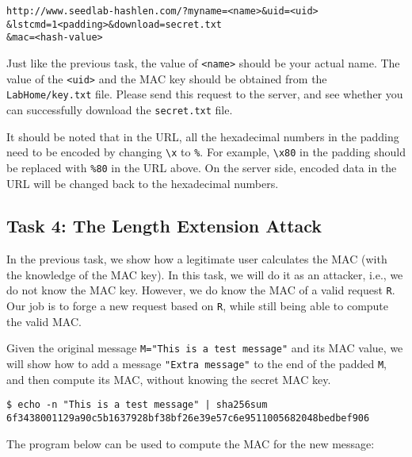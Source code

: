 \begin{lstlisting}
http://www.seedlab-hashlen.com/?myname=<name>&uid=<uid>
&lstcmd=1<padding>&download=secret.txt
&mac=<hash-value>
\end{lstlisting}

Just like the previous task, the value of \texttt{<name>} should be your actual name. 
The value of the \texttt{<uid>} and the MAC key should be 
obtained from the \texttt{LabHome/key.txt} file.
Please send this request to the server, and see whether you can
successfully download the \texttt{secret.txt} file.  

It should be noted that in the URL, 
all the hexadecimal numbers in the padding 
need to be encoded by changing
\texttt{\textbackslash x} to \texttt{\%}. For example, 
\texttt{\textbackslash x80} in the padding should be 
replaced with \texttt{\%80} in the URL above. 
On the server side, encoded data in the URL 
will be changed back to the hexadecimal numbers. 


\subsection{Task 4: The Length Extension Attack}


In the previous task, we show how a legitimate user calculates the MAC (with
the knowledge of the MAC key). In this task, we will do it as an attacker,
i.e., we do not know the MAC key. However, we do know the MAC of a valid 
request \texttt{R}. Our job is to forge a new request based on \texttt{R},
while still being able to compute the valid MAC. 

Given the original message \texttt{M="This is a test message"} and its 
MAC value, we will show how to add a message 
\texttt{"Extra message"} to the end of the padded \texttt{M}, and 
then compute its MAC, without knowing the secret MAC key. 

\begin{lstlisting}
$ echo -n "This is a test message" | sha256sum
6f3438001129a90c5b1637928bf38bf26e39e57c6e9511005682048bedbef906
\end{lstlisting}

The program below can be used to compute the MAC for the 
new message: 

